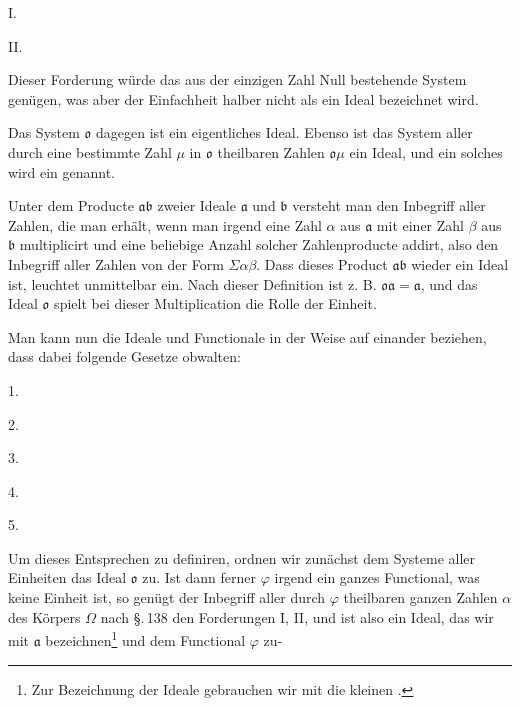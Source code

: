 I. 

II. 

Dieser Forderung würde das aus der einzigen Zahl Null bestehende System genügen, was aber der Einfachheit halber nicht als ein Ideal bezeichnet wird.

Das System $\mathfrak{o}$ dagegen ist ein eigentliches Ideal. Ebenso ist das System aller durch eine bestimmte Zahl $\mu$ in $\mathfrak{o}$ theilbaren Zahlen $\mathfrak{o}\mu$ ein Ideal, und ein solches wird ein  genannt.

Unter dem Producte $\mathfrak{a}\mathfrak{b}$ zweier Ideale $\mathfrak{a}$ und $\mathfrak{b}$ versteht man den Inbegriff aller Zahlen, die man erhält, wenn man irgend eine Zahl $\alpha$ aus $\mathfrak{a}$ mit einer Zahl $\beta$ aus $\mathfrak{b}$ multiplicirt und eine beliebige Anzahl solcher Zahlenproducte addirt, also den Inbegriff aller Zahlen von der Form $\Sigma \alpha\beta$. Dass dieses Product $\mathfrak{a}\mathfrak{b}$ wieder ein Ideal ist, leuchtet unmittelbar ein. Nach dieser Definition ist z. B. $\mathfrak{o}\mathfrak{a} = \mathfrak{a}$, und das Ideal $\mathfrak{o}$ spielt bei dieser Multiplication die Rolle der Einheit.

Man kann nun die Ideale und Functionale in der Weise auf einander beziehen, dass dabei folgende Gesetze obwalten:

1. 

2. 

3. 

4. 

5. 

Um dieses Entsprechen zu definiren, ordnen wir zunächst dem Systeme aller Einheiten das Ideal $\mathfrak{o}$ zu. Ist dann ferner $\varphi$ irgend ein ganzes Functional, was keine Einheit ist, so genügt der Inbegriff aller durch $\varphi$ theilbaren ganzen Zahlen $\alpha$ des Körpers $\Omega$ nach \S.\,138 den Forderungen I, II, und ist also ein Ideal, das wir mit $\mathfrak{a}$ bezeichnen\footnote{Zur Bezeichnung der Ideale gebrauchen wir mit  die kleinen .} und dem Functional $\varphi$ zu-

